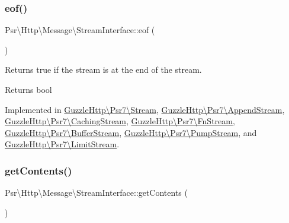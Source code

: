 \subsubsection{\texorpdfstring{eof()}{eof()}}
{\footnotesize\ttfamily Psr\textbackslash{}\+Http\textbackslash{}\+Message\textbackslash{}\+Stream\+Interface\+::eof (\begin{DoxyParamCaption}{ }\end{DoxyParamCaption})}

Returns true if the stream is at the end of the stream.

\begin{DoxyReturn}{Returns}
bool 
\end{DoxyReturn}


Implemented in \hyperlink{classGuzzleHttp_1_1Psr7_1_1Stream_a3f44f4ac800bd92b0adc5539ac6ad64f}{Guzzle\+Http\textbackslash{}\+Psr7\textbackslash{}\+Stream}, \hyperlink{classGuzzleHttp_1_1Psr7_1_1AppendStream_a926c579f7f50d37b6f48b56d039437a5}{Guzzle\+Http\textbackslash{}\+Psr7\textbackslash{}\+Append\+Stream}, \hyperlink{classGuzzleHttp_1_1Psr7_1_1CachingStream_ae247cc3e854b0e58fc4b00a0b5fcc9ab}{Guzzle\+Http\textbackslash{}\+Psr7\textbackslash{}\+Caching\+Stream}, \hyperlink{classGuzzleHttp_1_1Psr7_1_1FnStream_a9e01510a73317b43ef96fdfc7cc7e1c8}{Guzzle\+Http\textbackslash{}\+Psr7\textbackslash{}\+Fn\+Stream}, \hyperlink{classGuzzleHttp_1_1Psr7_1_1BufferStream_a41a46baafe72165dc167b7fd5e4053ae}{Guzzle\+Http\textbackslash{}\+Psr7\textbackslash{}\+Buffer\+Stream}, \hyperlink{classGuzzleHttp_1_1Psr7_1_1PumpStream_a1a319d252ffe5ca8ee0afd4248bbc21d}{Guzzle\+Http\textbackslash{}\+Psr7\textbackslash{}\+Pump\+Stream}, and \hyperlink{classGuzzleHttp_1_1Psr7_1_1LimitStream_a88b0131f6bccc09e6dc02800fe558505}{Guzzle\+Http\textbackslash{}\+Psr7\textbackslash{}\+Limit\+Stream}.

\mbox{\label{interfacePsr_1_1Http_1_1Message_1_1StreamInterface_a77f73d536f77e4a4e281d548ee905276}} 
\subsubsection{\texorpdfstring{get\+Contents()}{getContents()}}
{\footnotesize\ttfamily Psr\textbackslash{}\+Http\textbackslash{}\+Message\textbackslash{}\+Stream\+Interface\+::get\+Contents (\begin{DoxyParamCaption}{ }\end{DoxyParamCaption})}


